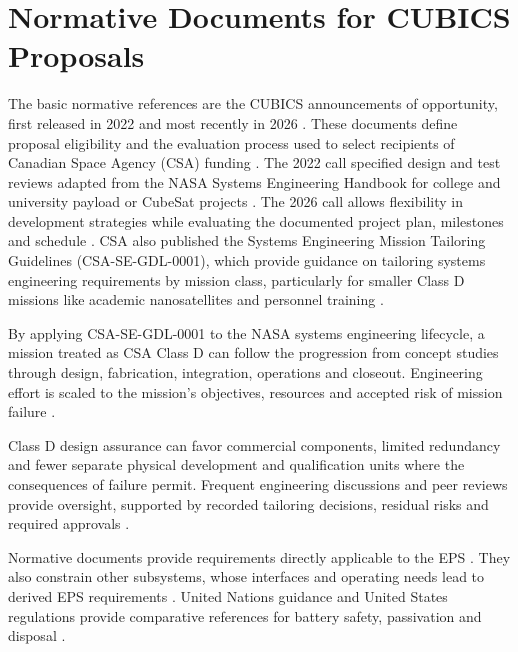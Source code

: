 \section{Normative Documents for CUBICS Proposals}
The basic normative references are the CUBICS announcements of opportunity, first released in 2022 and most recently in 2026 \citep{csa2022cubics,csa2026cubics}.
These documents define proposal eligibility and the evaluation process used to select recipients of Canadian Space Agency (CSA) funding \citep[Secs.~3 and~5]{csa2026cubics}.
The 2022 call specified design and test reviews adapted from the NASA Systems Engineering Handbook for college and university payload or CubeSat projects \citep[App.~B.7]{csa2022cubics}. The 2026 call allows flexibility in development strategies while evaluating the documented project plan, milestones and schedule \citep[FAQ~24 and App.~C.2.1]{csa2026cubics}.
CSA also published the Systems Engineering Mission Tailoring Guidelines (CSA-SE-GDL-0001), which provide guidance on tailoring systems engineering requirements by mission class, particularly for smaller Class D missions like academic nanosatellites and personnel training \citep[Secs.~1.1--1.3]{csa2020tailoring}.

By applying CSA-SE-GDL-0001 to the NASA systems engineering lifecycle, a mission treated as CSA Class D can follow the progression from concept studies through design, fabrication, integration, operations and closeout.
Engineering effort is scaled to the mission's objectives, resources and accepted risk of mission failure \citep[Secs.~3 and~3.11]{nasa2016systems}\citep[Sec.~3.2]{csa2020tailoring}.

Class D design assurance can favor commercial components, limited redundancy and fewer separate physical development and qualification units where the consequences of failure permit.
Frequent engineering discussions and peer reviews provide oversight, supported by recorded tailoring decisions, residual risks and required approvals \citep[Sec.~3.4.1]{csa2020tailoring}\citep[Sec.~3.11.3]{nasa2016systems}.

Normative documents provide requirements directly applicable to the EPS \citep[Sec.~2.3]{calpoly2022cds}.
They also constrain other subsystems, whose interfaces and operating needs lead to derived EPS requirements \citep[Secs.~4.2--4.3]{nasa2016systems}.
United Nations guidance and United States regulations provide comparative references for battery safety, passivation and disposal \citep{unoosa2010debris,fcc2026satellitecommunications}.

